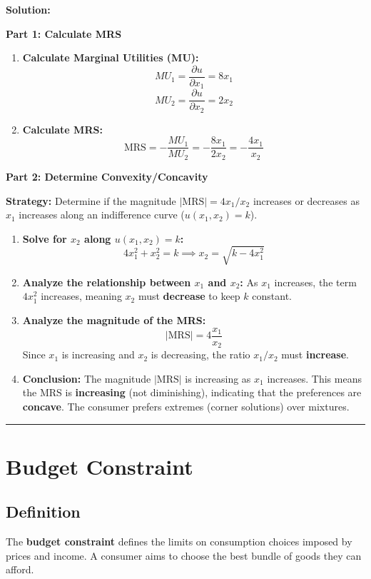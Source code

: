 \documentclass{article}
\begin{document}
\textbf{Solution:}

\textbf{Part 1: Calculate MRS}
\begin{enumerate}
    \item \textbf{Calculate Marginal Utilities (MU):} $$ MU_1 = \frac{\partial u}{\partial x_1} = 8x_1 $$ $$ MU_2 = \frac{\partial u}{\partial x_2} = 2x_2 $$
    \item \textbf{Calculate MRS:} $$ \text{MRS} = -\frac{MU_1}{MU_2} = -\frac{8x_1}{2x_2} = -\frac{4x_1}{x_2} $$
\end{enumerate}

\textbf{Part 2: Determine Convexity/Concavity}

\textbf{Strategy:} Determine if the magnitude $|\text{MRS}| = 4x_1/x_2$ increases or decreases as $x_1$ increases along an indifference curve ($u(x_1, x_2)=k$).

\begin{enumerate}
    \item \textbf{Solve for $x_2$ along $u(x_1, x_2) = k$:} $$ 4x_1^2 + x_2^2 = k \implies x_2 = \sqrt{k - 4x_1^2} $$
    \item \textbf{Analyze the relationship between $x_1$ and $x_2$:} As $x_1$ increases, the term $4x_1^2$ increases, meaning $x_2$ must \textbf{decrease} to keep $k$ constant.
    \item \textbf{Analyze the magnitude of the MRS:} $$ |\text{MRS}| = 4 \frac{x_1}{x_2} $$ Since $x_1$ is increasing and $x_2$ is decreasing, the ratio $x_1/x_2$ must \textbf{increase}.
    \item \textbf{Conclusion:} The magnitude $|\text{MRS}|$ is increasing as $x_1$ increases. This means the MRS is \textbf{increasing} (not diminishing), indicating that the preferences are \textbf{concave}. The consumer prefers extremes (corner solutions) over mixtures.
\end{enumerate}

\hrule

\section*{Budget Constraint}

\subsection*{Definition}

The \textbf{budget constraint} defines the limits on consumption choices imposed by prices and income. A consumer aims to choose the best bundle of goods they can afford.
\end{document}
